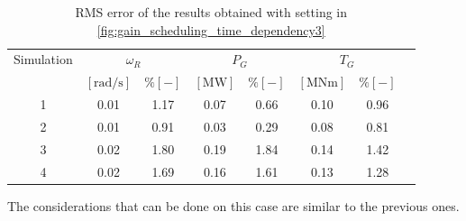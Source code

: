 \begin{table}[htb]
  \caption{RMS error of the results obtained with setting in \autoref{fig:gain_scheduling_time_dependency3}}
  \centering
  \begin{tabular}{cccccccc}
    \toprule
      Simulation & \multicolumn{2}{c}{$\omega_R$} & \multicolumn{2}{c}{$P_G$} & \multicolumn{2}{c}{$T_G$} \\ 
       & $\left[\si{\radian\per\second}\right]$ & $ \% \left[-\right]$ & $\left[\si{\mega\watt}\right]$ & $ \% \left[-\right]$ & $\left[\si{\mega\newton\meter} \right]$ & $ \% \left[-\right]$ \\ \midrule        
     1 & 0.01 &  1.17 &  0.07  &  0.66  &  0.10  &  0.96  \\
     2 & 0.01 &  0.91 &  0.03  &  0.29  &  0.08  &  0.81  \\
     3 & 0.02 &  1.80 &  0.19  &  1.84  &  0.14  &  1.42  \\
     4 & 0.02 &  1.69 &  0.16  &  1.61  &  0.13  &  1.28 \\ 
    
     \bottomrule
  \end{tabular}
  \label{tab:res_variable_gains3}
\end{table}

The considerations that can be done on this case are similar to the previous ones. 

